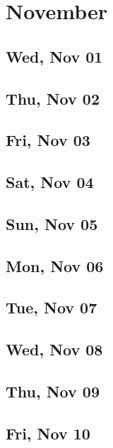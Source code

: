 \chapter{November}
	\section{Wed, Nov 01}
		
	\section{Thu, Nov 02}
		
	\section{Fri, Nov 03}
		
	\section{Sat, Nov 04}
		
	\section{Sun, Nov 05}
		
	\section{Mon, Nov 06}
		
	\section{Tue, Nov 07}
		
	\section{Wed, Nov 08}
		
	\section{Thu, Nov 09}
		
	\section{Fri, Nov 10}
		
